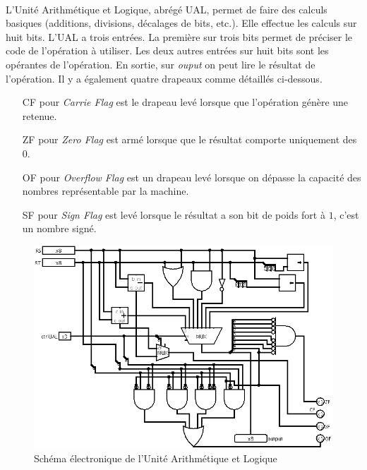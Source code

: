 \paragraph{}{
	L'Unité Arithmétique et Logique, abrégé UAL, permet de faire des calculs
	basiques (additions, divisions, décalages de bits, etc.). Elle effectue
	les calculs sur huit bits. L'UAL a trois entrées. La première sur trois bits
	permet de préciser le code de l'opération à utiliser. Les deux autres entrées
	sur huit bits sont les opérantes de l'opération. \newline
	En sortie, sur \textit{ouput} on peut lire le résultat de l'opération. Il
	y a également quatre drapeaux comme détaillés ci-dessous.
}

\begin{itemize}
	\item[CF] pour \textit{Carrie Flag} est le drapeau levé lorsque que l'opération
	génère une retenue.
	\item[ZF] pour \textit{Zero Flag} est armé lorsque que le résultat comporte uniquement
	des $0$.
	\item[OF] pour \textit{Overflow Flag} est un drapeau levé lorsque on dépasse
	la capacité des nombres représentable par la machine.
	\item[SF] pour \textit{Sign Flag} est levé lorsque le résultat a son
	bit de poids fort à $1$, c'est un nombre signé.
\end{itemize}

\begin{figure}
	\centering
	\includegraphics[scale=0.4,origin=c]{circuits/UAL.png}
	\caption{\label{ual_circ} Sch\'{e}ma \'{e}lectronique de l'Unit\'{e} Arithm\'{e}tique et Logique}
\end{figure}

